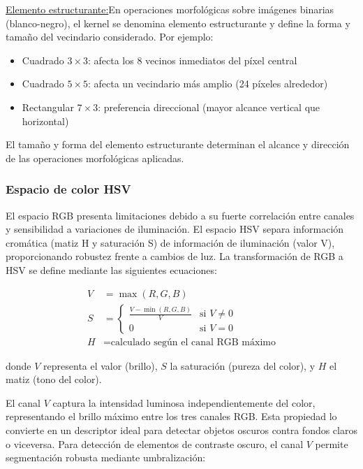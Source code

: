 \underline{Elemento estructurante:}En operaciones morfológicas sobre imágenes binarias (blanco-negro), el kernel se denomina elemento estructurante y define la forma y tamaño del vecindario considerado. Por ejemplo:
\begin{itemize}[label=$\bullet$]
\item Cuadrado $3 \times 3$: afecta los 8 vecinos inmediatos del píxel central
\item Cuadrado $5 \times 5$: afecta un vecindario más amplio (24 píxeles alrededor)
\item Rectangular $7 \times 3$: preferencia direccional (mayor alcance vertical que horizontal)
\end{itemize}

El tamaño y forma del elemento estructurante determinan el alcance y dirección de las operaciones morfológicas aplicadas.

\subsubsection{Espacio de color HSV}

El espacio RGB presenta limitaciones debido a su fuerte correlación entre canales y sensibilidad a variaciones de iluminación. El espacio HSV separa información cromática (matiz H y saturación S) de información de iluminación (valor V), proporcionando robustez frente a cambios de luz. La transformación de RGB a HSV se define mediante las siguientes ecuaciones:

\begin{align}
V &= \max(R, G, B) \\
S &= \begin{cases}
\frac{V - \min(R,G,B)}{V} & \text{si } V \neq 0 \\
0 & \text{si } V = 0
\end{cases} \\
H &= \text{calculado según el canal RGB máximo}
\end{align}

donde $V$ representa el valor (brillo), $S$ la saturación (pureza del color), y $H$ el matiz (tono del color).

El canal $V$ captura la intensidad luminosa independientemente del color, representando el brillo máximo entre los tres canales RGB. Esta propiedad lo convierte en un descriptor ideal para detectar objetos oscuros contra fondos claros o viceversa. Para detección de elementos de contraste oscuro, el canal $V$ permite segmentación robusta mediante umbralización:

